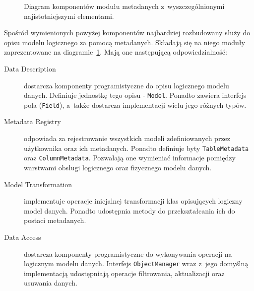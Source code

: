 \begin{figure}[ht!]
	\centering
	\caption{Diagram komponentów modułu metadanych z~wyszczególnionymi najistotniejszymi elementami.}
	\label{fig:omc_metadata_components}
\end{figure}

Spośród wymienionych powyżej komponentów najbardziej rozbudowany służy do opisu modelu logicznego za pomocą metadanych. Składają się na niego moduły zaprezentowane na diagramie~\ref{fig:omc_metadata_components}. Mają one następującą odpowiedzialność:

\begin{description}
	\item[Data Description] dostarcza komponenty programistyczne do opisu logicznego modelu danych. Definiuje jednostkę tego opisu - \verb+Model+. Ponadto zawiera interfejs pola (\verb+Field+), a~także dostarcza implementacji wielu jego różnych typów.
	\item[Metadata Registry] odpowiada za rejestrowanie wszystkich modeli zdefiniowanych przez użytkownika oraz ich metadanych. Ponadto definiuje byty \verb+TableMetadata+ oraz \verb+ColumnMetadata+. Pozwalają one wymieniać informacje pomiędzy warstwami obsługi logicznego oraz fizycznego modelu danych. 
	\item[Model Transformation] implementuje operacje inicjalnej transformacji klas opisujących logiczny model danych. Ponadto udostępnia metody do przekształcania ich do postaci metadanych.
	\item[Data Access] dostarcza komponenty programistyczne do wykonywania operacji na logicznym modelu danych. Interfejs \verb+ObjectManager+ wraz z~jego domyślną implementacją udostępniają operacje filtrowania, aktualizacji oraz usuwania danych.
\end{description}

